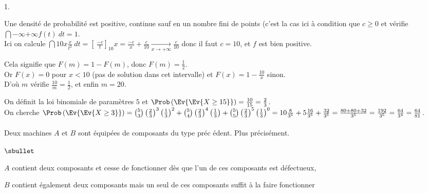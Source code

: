 \documentclass[11pt]{article}%
\begin{document}
 \begin{exercice} \indent \\

 \begin{noliste}{1.}
 \setlength{\itemsep}{4mm}
 \item Une densité de probabilité est positive, continue sauf en un
nombre fini de points (c'est la cas ici à condition que $c \geq 0$ et
vérifie $\dint{-\infty}{+ \infty} f(t)\ dt = 1$. \\
 Ici on calcule $\dint{10}{x} \frac{x}{t^{2}}\ dt = \left[ \
\frac{-c}{t} \right]_{10}{x} = \frac{-c}{x} + \frac{c}{10}
\xrightarrow[x \rightarrow + \infty]{} \frac{c}{10}$ donc il faut $c =
10$, et $f$ est bien positive. \\

 \item Cela signifie que $F(m) = 1 - F(m)$, donc $F(m) = \frac{1}{2}$.
\\
 Or $F(x) = 0$ pour $x < 10$ (pas de solution dans cet intervalle) et
$F(x) = 1 - \frac{10}{x}$ sinon. \\
 D'où $m$ vérifie $\frac{10}{m} = \frac{1}{2}$, et enfin $m = 20$. \\

 \item On définit la loi binomiale de paramètres $5$ et
$\Prob\left(\Ev{\Ev{ X \geq 15}}\right) = \frac{10}{15} = \frac{2}{3}$.
\\
 On cherche $\Prob\left(\Ev{\Ev{ X \geq 3}}\right) = \binom{5}{3}
\left( \frac{2}{3} \right)^{3} \left( \frac{1}{3} \right)^{2} +
\binom{5}{4} \left( \frac{2}{3} \right)^{4} \left( \frac{1}{3} \right)
+ \binom{5}{5} \left( \frac{2}{3} \right)^{5} \left( \frac{1}{3}
\right)^{0} = 10 \frac{8}{3^{5}} + 5 \frac{16}{3^{5}} +
\frac{32}{3^{5}} = \frac{80 + 80 + 32}{3^{5}} = \frac{192}{3^{5}} =
\frac{64}{3^{4}} = \frac{64}{81}$. \\
 \\
 Deux machines $A$ et $B$ sont équipées de composants du type préc
édent. Plus précisément.

 \begin{noliste}{$\sbullet$}
 \item $A$ contient deux composants et cesse de fonctionner dès que
l'un
 de ces composants est défectueux,

 \item $B$ contient également deux composants mais un seul de ces
 composants suffit à la faire fonctionner
 \end{noliste}


\end{noliste}
\end{exercice}
\end{document}
